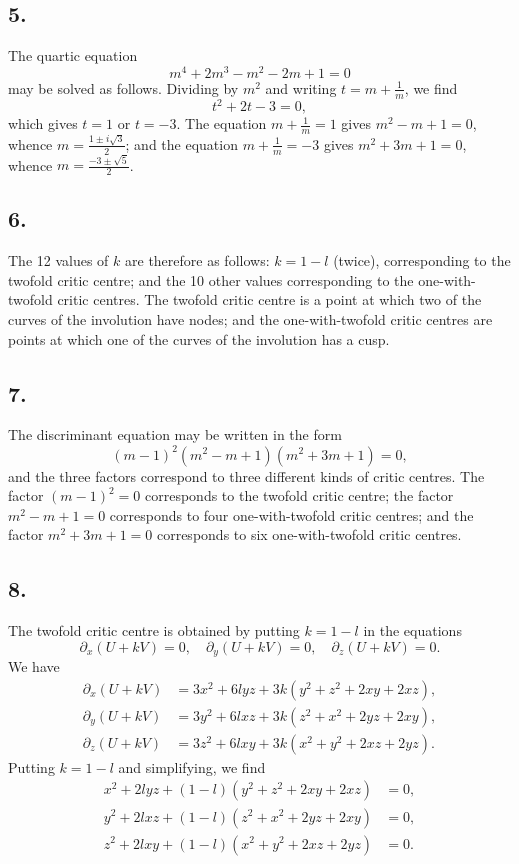 \documentclass[11pt,a4paper]{article}
\theoremstyle{definition}
\begin{document}
\subsection*{5.}

The quartic equation
\[
m^{4} + 2m^{3} - m^{2} - 2m + 1 = 0
\]
may be solved as follows. Dividing by $m^{2}$ and writing $t = m + \frac{1}{m}$, we find
\[
t^{2} + 2t - 3 = 0,
\]
which gives $t = 1$ or $t = -3$. The equation $m + \frac{1}{m} = 1$ gives $m^{2} - m + 1 = 0$, whence
$m = \frac{1 \pm i\sqrt{3}}{2}$; and the equation $m + \frac{1}{m} = -3$ gives $m^{2} + 3m + 1 = 0$, whence
$m = \frac{-3 \pm \sqrt{5}}{2}$.

\subsection*{6.}

The 12 values of $k$ are therefore as follows: $k = 1 - l$ (twice), corresponding to the
twofold critic centre; and the 10 other values corresponding to the one-with-twofold
critic centres. The twofold critic centre is a point at which two of the curves of the
involution have nodes; and the one-with-twofold critic centres are points at which one
of the curves of the involution has a cusp.

\newpage
\subsection*{7.}

The discriminant equation may be written in the form
\[
(m - 1)^{2}(m^{2} - m + 1)(m^{2} + 3m + 1) = 0,
\]
and the three factors correspond to three different kinds of critic centres. The factor
$(m - 1)^{2} = 0$ corresponds to the twofold critic centre; the factor $m^{2} - m + 1 = 0$ corresponds
to four one-with-twofold critic centres; and the factor $m^{2} + 3m + 1 = 0$ corresponds to six
one-with-twofold critic centres.

\subsection*{8.}

The twofold critic centre is obtained by putting $k = 1 - l$ in the equations
\[
\partial_{x}(U + kV) = 0,\quad \partial_{y}(U + kV) = 0,\quad \partial_{z}(U + kV) = 0.
\]
We have
\begin{align*}
\partial_{x}(U + kV) &= 3x^{2} + 6lyz + 3k(y^{2} + z^{2} + 2xy + 2xz),\\
\partial_{y}(U + kV) &= 3y^{2} + 6lxz + 3k(z^{2} + x^{2} + 2yz + 2xy),\\
\partial_{z}(U + kV) &= 3z^{2} + 6lxy + 3k(x^{2} + y^{2} + 2xz + 2yz).
\end{align*}
Putting $k = 1 - l$ and simplifying, we find
\begin{align*}
x^{2} + 2lyz + (1 - l)(y^{2} + z^{2} + 2xy + 2xz) &= 0,\\
y^{2} + 2lxz + (1 - l)(z^{2} + x^{2} + 2yz + 2xy) &= 0,\\
z^{2} + 2lxy + (1 - l)(x^{2} + y^{2} + 2xz + 2yz) &= 0.
\end{align*}
\end{document}
